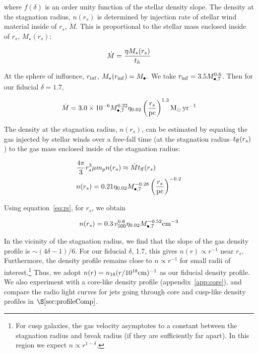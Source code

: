 \documentclass[usenatbib,fleqn]{mnras}
\newcommand{\Mbh}[1][]{M_{\bullet#1}}
\newcommand{\Msun}{{\rm M_\odot}}
\newcommand{\rs}{r_s}
\begin{document}
where $f(\delta)$ is an order unity function of the stellar density slope.
The density at the stagnation radius, $n(\rs)$ is determined by
injection rate of stellar wind material inside of $\rs$,
$\dot{M}$. This is proportional to the stellar mass enclosed inside of
$\rs$, $M_{\star}(\rs)$:

\begin{equation}
\dot{M}=\frac{\eta M_{\rm \star}(\rs)}{t_h}
\label{eq:dotM}
\end{equation}

At the sphere of influence, $r_{\rm inf}$, $M_{\star}(r_{\rm
  inf})=\Mbh.$ We take $r_{\rm inf}=3.5 \Mbh[,7]^{0.6}$. Then for our
fiducial $\delta=1.7$,

\begin{equation}
\dot{M}= 3.0 \times 10^{-6} \Mbh[,7]^{0.22} \eta_{0.02} \left(\frac{r_s}{\rm
  pc}\right)^{1.3} \Msun \, {\rm yr}^{-1}
\end{equation}


The density at the stagnation radius, $n(\rs)$, can be estimated
by equating the gas injected by stellar winds over a free-fall time
(at the stagnation radius--$t_{\rm ff} (\rs)$) to the gas mass
enclosed inside of the stagnation radius:

\begin{align}
  &\frac{4 \pi}{3} \rs^3 \mu m_p n(r_s) \approx \dot{M} t_{\rm ff}
  (\rs) \nonumber\\
  &n(r_s) = 0.21 \eta_{0.02} \Mbh[,7]^{-0.28} \left(\frac{r_s}{\rm
      pc}\right)^{-0.2}
\label{eq:nrs}
\end{align}
 
Using equation~\eqref{eq:rs}, for $r_s$, we obtain 

\begin{equation}
n(r_s)=0.3 \, v_{500}^{0.6} \eta_{0.02} \Mbh[,7]^{-0.52} {\rm cm}^{-3}
\label{eq:nrs2}
\end{equation}

In the vicinity of the stagnation radius, we find that the slope of
the gas density profile is $\sim (4\delta-1)/6$. For our fiducial
$\delta$, 1.7, this gives $n(r)\propto r^{-1}$ near
$\rs$. Furthermore, the density profile remains close to $n\propto
r^{-1}$ for small radii of interest.\footnote{For cusp galaxies, the
  gas velocity asymptotes to a constant between the stagnation radius
  and break radius (if they are sufficiently far apart). In this
  region we expect $n\propto r^{1-\delta}$.}  Thus, we adopt $n(r)=
n_{18} (r/10^{18} {\rm cm})^{-1}$ as our fiducial density profile.  We
also experiment with a core-like density profile
(appendix~\ref{app:core}), and compare the radio light curves for jets
going through core and cusp-like density profiles in
$\S\ref{sec:profileComp}$.
\end{document}
